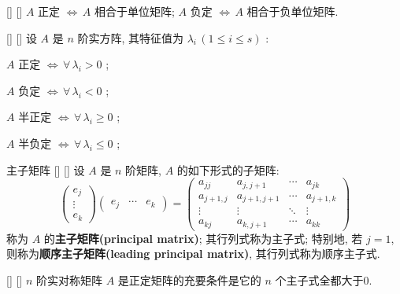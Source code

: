 \documentclass[UTF8]{ctexart}
\DeclareMathOperator{\0}{\mathbf{0}}
\DeclareMathOperator{\<}{\langle}
\renewcommand{\>}{\rangle}
\begin{document}
		\begin{ppt}
			[]
			{}
			[]
			[]
			 \(A\) 正定 \(\iff\,A\) 相合于单位矩阵;  \(A\) 负定 \(\iff\,A\) 相合于负单位矩阵.
		\end{ppt}

		\begin{ppt}
			[]
			{}
			[]
			[]
			设 \(A\) 是 \(n\) 阶实方阵, 其特征值为 \(\lambda_i\,(1\leqslant i\leqslant s)\) : 

			 \(A\) 正定 \(\iff\,\forall\,\lambda_i>0\) ;

			 \(A\) 负定 \(\iff\,\forall\,\lambda_i<0\) ;

			 \(A\) 半正定 \(\iff\,\forall\,\lambda_i\geqslant 0\) ;

			 \(A\) 半负定 \(\iff\,\forall\,\lambda_i\leqslant 0\) ;
		\end{ppt}

		\begin{dfn}
			[]
			{主子矩阵}
			[]
			[]
			设 \(A\) 是 \(n\) 阶矩阵,  \(A\) 的如下形式的子矩阵:\[ \begin{pmatrix}
				e_j\\\vdots\\e_k
			\end{pmatrix}\begin{pmatrix}
				e_j&\cdots&e_k
			\end{pmatrix}=
			\begin{pmatrix}
				a_{jj}&a_{j,j+1}&\cdots&a_{jk}\\a_{j+1,j}&a_{j+1,j+1}&\cdots&a_{j+1,k}\\\vdots&\vdots&\ddots&\vdots \\a_{kj}&a_{k,j+1}&\cdots&a_{kk}
			\end{pmatrix}
			\]
			称为 \(A\) 的\textbf{主子矩阵(principal matrix)}; 其行列式称为主子式; 特别地, 若 \(j=1\), 则称为\textbf{顺序主子矩阵(leading principal matrix)}, 其行列式称为顺序主子式.
		\end{dfn}

		\begin{thm}
			[]
			{}
			[]
			[]
			 \(n\) 阶实对称矩阵 \(A\) 是正定矩阵的充要条件是它的 \(n\) 个主子式全都大于0.
		\end{thm}
\end{document}
